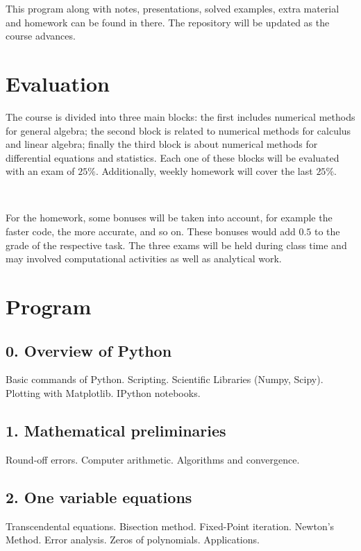 \documentclass[a4,useAMS,usenatbib,usegraphicx,12pt]{article}
\begin{document}
This program along with notes, presentations, solved examples, extra material
and homework can be found in there. The repository will be updated as the
course advances.

\section*{Evaluation}

The course is divided into three main blocks: the first includes numerical
methods for general algebra; the second block is related to numerical methods 
for calculus and linear algebra; finally the third block is about numerical 
methods for differential equations and statistics. Each one of these blocks 
will be evaluated with an exam of $25\%$. Additionally, weekly homework will 
cover the last $25\%$.

\

For the homework, some bonuses will be taken into account, for example the 
faster code, the more accurate, and so on. These bonuses would add $0.5$ to 
the grade of the respective task. The three exams will be held during class
time and may involved computational activities as well as analytical work.

\newpage
\section*{Program}

\subsection*{0. Overview of Python}
Basic commands of Python. Scripting. Scientific Libraries (Numpy, Scipy). 
Plotting with Matplotlib. IPython notebooks.

\subsection*{1. Mathematical preliminaries}
Round-off errors. Computer arithmetic. Algorithms and convergence.

\subsection*{2. One variable equations}
Transcendental equations. Bisection method. Fixed-Point iteration. Newton's 
Method. Error analysis. Zeros of polynomials. Applications.
\end{document}
